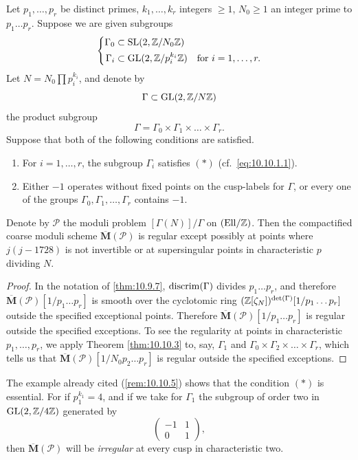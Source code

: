 \begin{kcor}\label{cor:10.10.7}
Let $p_1, \dots, p_r$ be distinct primes, $k_1, \dots, k_r$ integers $\ge 1$, $N_0 \ge 1$ an integer prime to $p_1 \dots p_r$. Suppose we are given subgroups
\[
\left\{
\begin{aligned}
\Gamma_0 &\subset \operatorname{SL}(2, \mathbb{Z}/N_0\mathbb{Z}) \\
\Gamma_i &\subset \operatorname{GL}(2, \mathbb{Z}/p_i^{k_i}\mathbb{Z}) \quad\text{for } i = 1, \dots, r .
\end{aligned}
\right.
\]
Let $N = N_0 \prod p_i^{k_i}$, and denote by
\[
\Gamma \subset \operatorname{GL}(2, \mathbb{Z}/N\mathbb{Z})
\]
the product subgroup
\[
\Gamma = \Gamma_0 \times \Gamma_1 \times \dots \times \Gamma_r .
\]
Suppose that both of the following conditions are satisfied.
\begin{enumerate}[label=(\alph*)]
\item For $i = 1, \dots, r$, the subgroup $\Gamma_i$ satisfies $(*)$ (cf.~\ref{eq:10.10.1.1}).
\item Either $-1$ operates without fixed points on the cusp-labels for $\Gamma$, or every one of the groups $\Gamma_0, \Gamma_1, \dots, \Gamma_r$ contains $-1$.
\end{enumerate}
Denote by $\mathcal{P}$ the moduli problem $[\Gamma(N)]/\Gamma$ on $(\mathrm{Ell}/\mathbb{Z})$. Then the compactified coarse moduli scheme $\overline{\mathbf{M}}(\mathcal{P})$ is regular except possibly at points where $j(j-1728)$ is not invertible or at supersingular points in characteristic $p$ dividing $N$.
\end{kcor}

\begin{proof}
In the notation of \eqref{thm:10.9.7}, $\operatorname{discrim}(\Gamma)$ divides $p_1 \dots p_r$, and therefore $\overline{\mathbf{M}}(\mathcal{P})[1/p_1 \dots p_r]$ is smooth over the cyclotomic ring $(\mathbb{Z}[\zeta_N])^{\det(\Gamma)}[1/p_1 \dots p_r]$ outside the specified exceptional points. Therefore $\overline{\mathbf{M}}(\mathcal{P})[1/p_1 \dots p_r]$ is regular outside the specified exceptions. To see the regularity at points in characteristic $p_1, \dots, p_r$, we apply Theorem \ref{thm:10.10.3} to, say, $\Gamma_1$ and $\Gamma_0 \times \Gamma_2 \times \dots \times \Gamma_r$, which tells us that $\overline{\mathbf{M}}(\mathcal{P})[1/N_0 p_2 \dots p_r]$ is regular outside the specified exceptions.
\end{proof}

\begin{krem}\label{rem:10.10.8}
The example already cited (\ref{rem:10.10.5}) shows that the condition $(*)$ is essential. For if $p_1^{k_1} = 4$, and if we take for $\Gamma_1$ the subgroup of order two in $\operatorname{GL}(2, \mathbb{Z}/4\mathbb{Z})$ generated by
\[
\begin{pmatrix} -1 & 1 \\ 0 & 1 \end{pmatrix} ,
\]
then $\overline{\mathbf{M}}(\mathcal{P})$ will be \emph{irregular} at every cusp in characteristic two.
\end{krem}

